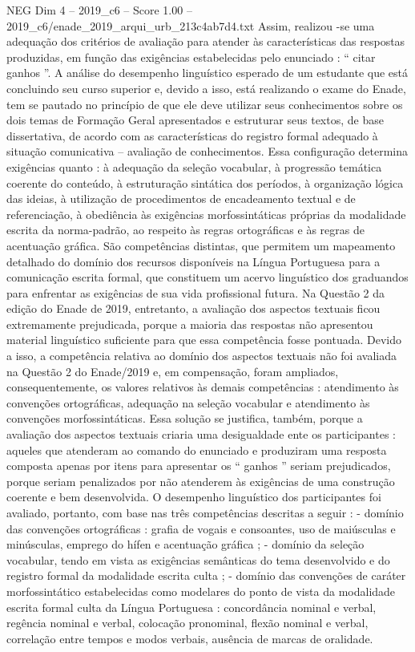 \begin{textsample}{NEG Dim 4 – 2019\_c6 – Score 1.00 – 2019\_c6/enade\_2019\_arqui\_urb\_213c4ab7d4.txt}
Assim, realizou -se uma adequação dos critérios de avaliação para atender às características das respostas produzidas, em função das exigências estabelecidas pelo enunciado : “ citar ganhos ”.
A análise do desempenho linguístico esperado de um estudante que está concluindo seu curso superior e, devido a isso, está realizando o exame do Enade, tem se pautado no princípio de que ele deve utilizar seus conhecimentos sobre os dois temas de Formação Geral apresentados e estruturar seus textos, de base dissertativa, de acordo com as características do registro formal adequado à situação comunicativa – avaliação de conhecimentos.
Essa configuração determina exigências quanto : à adequação da seleção vocabular, à progressão temática coerente do conteúdo, à estruturação sintática dos períodos, à organização lógica das ideias, à utilização de procedimentos de encadeamento textual e de referenciação, à obediência às exigências morfossintáticas próprias da modalidade escrita da norma-padrão, ao respeito às regras ortográficas e às regras de acentuação gráfica.
São competências distintas, que permitem um mapeamento detalhado do domínio dos recursos disponíveis na Língua Portuguesa para a comunicação escrita formal, que constituem um acervo linguístico dos graduandos para enfrentar as exigências de sua vida profissional futura.
Na Questão 2 da edição do Enade de 2019, entretanto, a avaliação dos aspectos textuais ficou extremamente prejudicada, porque a maioria das respostas não apresentou material linguístico suficiente para que essa competência fosse pontuada.
Devido a isso, a competência relativa ao domínio dos aspectos textuais não foi avaliada na Questão 2 do Enade/2019 e, em compensação, foram ampliados, consequentemente, os valores relativos às demais competências : atendimento às convenções ortográficas, adequação na seleção vocabular e atendimento às convenções morfossintáticas.
Essa solução se justifica, também, porque a avaliação dos aspectos textuais criaria uma desigualdade ente os participantes : aqueles que atenderam ao comando do enunciado e produziram uma resposta composta apenas por itens para apresentar os “ ganhos ” seriam prejudicados, porque seriam penalizados por não atenderem às exigências de uma construção coerente e bem desenvolvida.
O desempenho linguístico dos participantes foi avaliado, portanto, com base nas três competências descritas a seguir : - domínio das convenções ortográficas : grafia de vogais e consoantes, uso de maiúsculas e minúsculas, emprego do hífen e acentuação gráfica ; - domínio da seleção vocabular, tendo em vista as exigências semânticas do tema desenvolvido e do registro formal da modalidade escrita culta ; - domínio das convenções de caráter morfossintático estabelecidas como modelares do ponto de vista da modalidade escrita formal culta da Língua Portuguesa : concordância nominal e verbal, regência nominal e verbal, colocação pronominal, flexão nominal e verbal, correlação entre tempos e modos verbais, ausência de marcas de oralidade.

\end{textsample}

